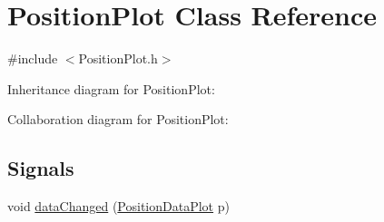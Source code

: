 \hypertarget{class_position_plot}{}\section{Position\+Plot Class Reference}
\label{class_position_plot}


{\ttfamily \#include $<$Position\+Plot.\+h$>$}



Inheritance diagram for Position\+Plot\+:


Collaboration diagram for Position\+Plot\+:
\subsection*{Signals}
\begin{DoxyCompactItemize}
\item 
void \hyperlink{class_position_plot_a7d2048e5829ddcdfe373189caccf22c1}{data\+Changed} (\hyperlink{class_position_data_plot}{Position\+Data\+Plot} p)
\end{DoxyCompactItemize}
